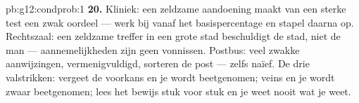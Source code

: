 \begin{solution}{pb:g12:condprob:1}
\textbf{20.} Kliniek: een zeldzame aandoening maakt van een sterke test een
zwak oordeel --- werk bij vanaf het basispercentage en stapel daarna op.
Rechtszaal: een zeldzame treffer in een grote stad beschuldigt de stad, niet
de man --- aannemelijkheden zijn geen vonnissen. Postbus: veel zwakke
aanwijzingen, vermenigvuldigd, sorteren de post --- zelfs naïef. De drie
valstrikken: vergeet de voorkans en je wordt beetgenomen; veins
 en je wordt zwaar beetgenomen; lees het bewijs stuk voor
stuk en je weet nooit wat je weet.
\end{solution}

